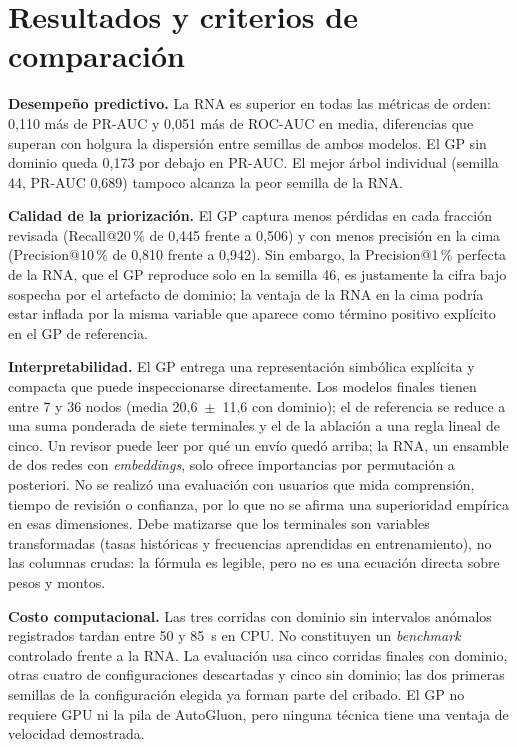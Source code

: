 \documentclass[conference]{IEEEtran}
\begin{document}
\section{Resultados y criterios de comparación}

\textbf{Desempeño predictivo.} La RNA es superior en todas las métricas de
orden: 0,110 más de PR-AUC y 0,051 más de ROC-AUC en media, diferencias que
superan con holgura la dispersión entre semillas de ambos modelos. El GP sin
dominio queda 0,173 por debajo en PR-AUC. El mejor árbol individual (semilla
44, PR-AUC 0,689) tampoco alcanza la peor semilla de la RNA.

\textbf{Calidad de la priorización.} El GP captura menos pérdidas en cada
fracción revisada (Recall@20\,\% de 0,445 frente a 0,506) y con menos
precisión en la cima (Precision@10\,\% de 0,810 frente a 0,942). Sin embargo,
la Precision@1\,\% perfecta de la RNA, que el GP reproduce solo en la semilla
46, es justamente la cifra bajo sospecha por el artefacto de dominio; la
ventaja de la RNA en la cima podría estar inflada por la misma variable que
aparece como término positivo explícito en el GP de referencia.

\textbf{Interpretabilidad.} El GP entrega una representación simbólica
explícita y compacta que puede inspeccionarse directamente.
Los modelos finales tienen entre 7 y 36 nodos (media 20,6~$\pm$~11,6 con
dominio); el de referencia se reduce a una suma ponderada de siete terminales
y el de la ablación a una regla lineal de cinco. Un revisor puede leer por qué
un envío quedó arriba; la RNA, un ensamble de dos redes con
\textit{embeddings}, solo ofrece importancias por permutación a posteriori.
No se realizó una evaluación con usuarios que mida comprensión, tiempo de
revisión o confianza, por lo que no se afirma una superioridad empírica en
esas dimensiones. Debe matizarse que los terminales son variables transformadas (tasas
históricas y frecuencias aprendidas en entrenamiento), no las columnas crudas:
la fórmula es legible, pero no es una ecuación directa sobre pesos y montos.

\textbf{Costo computacional.} Las tres corridas con dominio sin intervalos
anómalos registrados tardan entre 50 y 85~s en CPU. No constituyen un
\textit{benchmark} controlado frente a la RNA. La evaluación usa cinco
corridas finales con dominio, otras cuatro de configuraciones descartadas
y cinco sin dominio; las dos primeras semillas de la configuración elegida
ya forman parte del cribado. El GP no requiere GPU ni la pila de AutoGluon,
pero ninguna técnica tiene una ventaja de velocidad demostrada.
\end{document}
